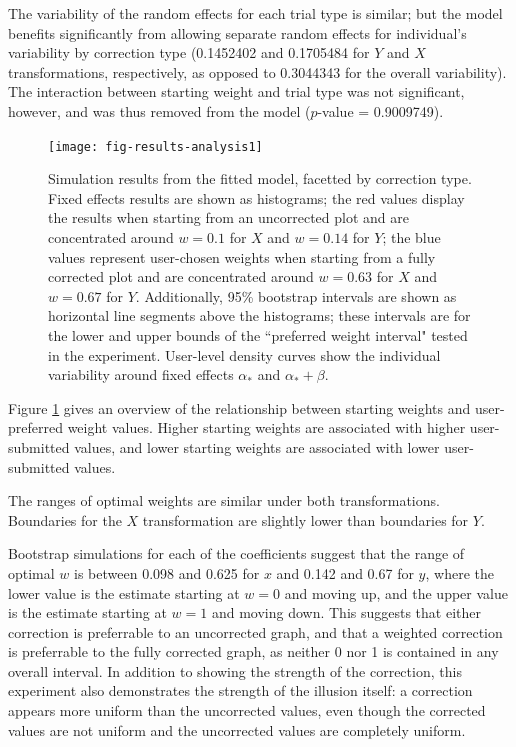 \documentclass[11pt]{isuthesis}\usepackage[]{graphicx}\usepackage[]{color}
\begin{document}
The variability of the random effects for each trial type is similar; but the model benefits significantly from allowing separate random effects for individual's variability by correction type (0.1452402 and 0.1705484 for $Y$ and $X$ transformations, respectively, as opposed to 0.3044343 for the overall variability). The interaction between starting weight and trial type was not significant, however, and was thus removed from the model ($p$-value = 0.9009749).

\begin{figure}[hbtp]
\centering
\texttt{[image: fig-results-analysis1]}
\caption[Results from mixed model]{Simulation results from the fitted model, facetted by correction type. Fixed effects results are shown as histograms; the red values display the results when starting from an uncorrected plot and are concentrated around $w=0.1$ for $X$ and $w=0.14$ for $Y$; the blue values represent user-chosen weights when starting from a fully corrected plot and are concentrated around $w=0.63$ for $X$ and $w=0.67$ for $Y$. Additionally, 95\% bootstrap intervals are shown as horizontal line segments above the histograms; these intervals are for the lower and upper bounds of the ``preferred weight interval" tested in the experiment. User-level density curves show the individual variability around  fixed effects $\alpha_*$ and $\alpha_*+\beta$.}\label{fig:MixedModelResults}
\end{figure}
Figure \ref{fig:MixedModelResults} gives an overview of the relationship between starting weights and  user-preferred weight values. Higher starting weights are associated with higher user-submitted values, and lower starting weights are associated with lower user-submitted values.

The ranges of optimal weights are similar under both transformations. Boundaries for the $X$ transformation are slightly lower than boundaries for $Y$. 

Bootstrap simulations for each of the coefficients suggest that the range of optimal $w$ is between 0.098 and 0.625 for $x$ and 0.142 and 0.67 for $y$, where the lower value is the estimate starting at $w=0$ and moving up, and the upper value is the estimate starting at $w=1$ and moving down. This suggests that either correction is preferrable to an uncorrected graph, and that a weighted correction is preferrable to the fully corrected graph, as neither 0 nor 1 is contained in any overall interval. In addition to showing the strength of the correction, this experiment also demonstrates the strength of the illusion itself: a correction appears more uniform than the uncorrected values, even though the corrected values are not uniform and the uncorrected values are completely uniform. 
\end{document}
